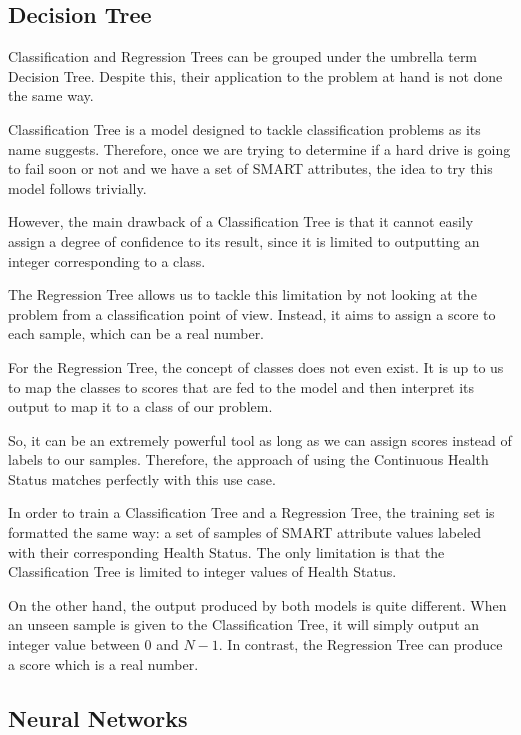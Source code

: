 \subsection{Decision Tree}\label{subsec:decision_tree}

Classification and Regression Trees can be grouped under the umbrella term Decision Tree.
Despite this, their application to the problem at hand is not done the same way.

Classification Tree is a model designed to tackle classification problems as its name suggests.
Therefore, once we are trying to determine if a hard drive is going to fail soon or not and we have a set of SMART attributes, the idea to try this model follows trivially.

However, the main drawback of a Classification Tree is that it cannot easily assign a degree of confidence to its result, since it is limited to outputting an integer corresponding to a class.

The Regression Tree allows us to tackle this limitation by not looking at the problem from a classification point of view.
Instead, it aims to assign a score to each sample, which can be a real number.

For the Regression Tree, the concept of classes does not even exist.
It is up to us to map the classes to scores that are fed to the model and then interpret its output to map it to a class of our problem.

So, it can be an extremely powerful tool as long as we can assign scores instead of labels to our samples.
Therefore, the approach of using the Continuous Health Status matches perfectly with this use case.

In order to train a Classification Tree and a Regression Tree, the training set is formatted the same way: a set of samples of SMART attribute values labeled with their corresponding Health Status.
The only limitation is that the Classification Tree is limited to integer values of Health Status.

On the other hand, the output produced by both models is quite different.
When an unseen sample is given to the Classification Tree, it will simply output an integer value between $0$ and $N-1$.
In contrast, the Regression Tree can produce a score which is a real number.

\subsection{Neural Networks}\label{subsec:nn}

